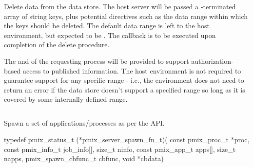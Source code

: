 
\optattrend

\descr

Delete data from the data store.
The host server will be passed a -terminated array of string keys, plus potential directives such as the data range within which the keys should be deleted. The default data range is left to the host environment, but expected to be .
The callback is to be executed upon completion of the delete procedure.

\advicermstart
The  and  of the requesting process will be provided to support authorization-based access to published information. The host environment is not required to guarantee support for any specific range - i.e., the environment does not need to return an error if the data store doesn't support a specified range so long as it is covered by some internally defined range.
\advicermend


\subsection{}

\summary

Spawn a set of applications/processes as per the  API.

\format

\cspecificstart
\begin{codepar}
typedef pmix_status_t (*pmix_server_spawn_fn_t)(
                             const pmix_proc_t *proc,
                             const pmix_info_t job_info[],
                             size_t ninfo,
                             const pmix_app_t apps[],
                             size_t napps,
                             pmix_spawn_cbfunc_t cbfunc,
                             void *cbdata)
\end{codepar}
\cspecificend

\begin{arglist}
\end{arglist}

